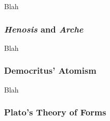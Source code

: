 Blah


\subsubsection{\textit{Henosis} and \textit{Arche}}


Blah


\subsubsection{Democritus' Atomism}

Blah


\subsubsection{Plato's Theory of Forms}

